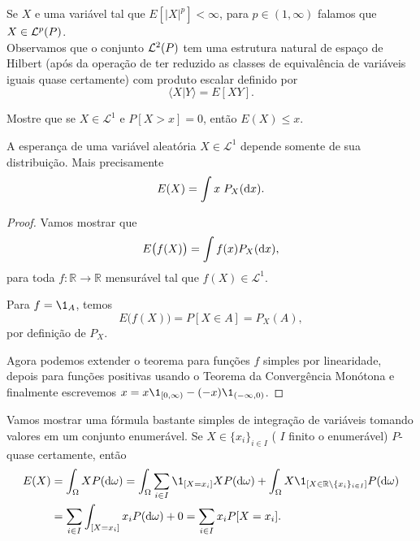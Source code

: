 \begin{remark}
 Se $X$ e uma variável tal que $E[|X|^p]<\infty$, para $p\in (1,\infty)$ falamos que $X\in {\ensuremath{\mathcal L}}^p(P)$. \\
Observamos que o conjunto ${\mathcal L}^2(P)$ tem uma estrutura natural de espaço de Hilbert
(após da operação de ter reduzido as classes de equivalência de variáveis iguais quase certamente) com produto escalar definido por
$$\langle X | Y \rangle= E[XY].$$
\end{remark}




\begin{exercise}
  Mostre que se $X \in \mathcal{L}^1$ e $P[X > x] = 0$, então $E(X) \leq x$.
\end{exercise}

\begin{lemma}
  A esperança de uma variável aleatória $X \in \mathcal{L}^1$ depende somente de sua distribuição.
  Mais precisamente
  \begin{equation}
    E(X) = \int x \; P_X (\mathop{}\!\mathrm{d} x).
  \end{equation}
\end{lemma}

\begin{proof}
  Vamos mostrar que
  \begin{equation}
    E\big(f(X)\big) = \int f(x) P_X (\mathop{}\!\mathrm{d} x),
  \end{equation}
  para toda $f: \mathbb{R} \to \mathbb{R}$ mensurável tal que $f(X) \in \mathcal{L}^1$.

  Para $f = \1_A$, temos
  \begin{equation}
    E\big(f(X)\big) = P[X \in A] =  P_X (A),
  \end{equation}
  por definição de $P_X$.

  Agora podemos extender o teorema para funções $f$ simples por linearidade,
  depois para funções positivas usando o Teorema da Convergência Monótona e
  finalmente escrevemos $x = x \1_{[0, \infty)} - (-x) \1_{(-\infty,0)}$.
\end{proof}

Vamos mostrar uma fórmula bastante simples de integração de variáveis tomando valores em um conjunto enumerável.
Se $X \in \{x_i\}_{i\in I}$ ( $I$ finito o enumerável) $P$-quase certamente, então
\begin{equation}
  \begin{split}
    E(X) & = \int_\Omega X P(\d \omega) = \int_{\Omega} \sum_{i\in I} \1_{[X = x_i]} X P(\d \omega) +
    \int_{\gO} X \1_{[X\in\bbR \setminus \{x_i\}_{i\in I}]}  P(\d \omega)\\
    & = \sum_{i\in I} \int_{[X = x_i]} x_i P(\d \omega) + 0 = \sum_{i\in I} x_i P[X = x_i].
  \end{split}
\end{equation}

